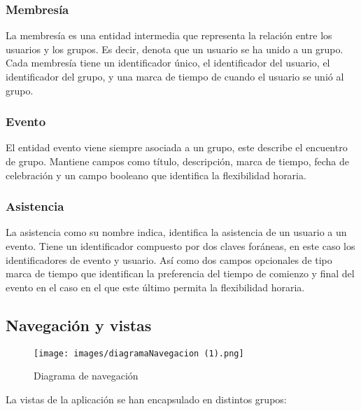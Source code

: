 \subsubsection{Membresía}
La membresía es una entidad intermedia que representa la relación entre los usuarios y los grupos. Es decir, denota que un usuario se ha unido a un grupo. Cada membresía tiene un identificador único, el identificador del usuario, el identificador del grupo, y una marca de tiempo de cuando el usuario se unió al grupo.

\subsubsection{Evento}
El entidad evento viene siempre asociada a un grupo, este describe el encuentro de grupo. Mantiene campos como título, descripción, marca de tiempo, fecha de celebración y un campo booleano que identifica la flexibilidad horaria.

\subsubsection{Asistencia}
La asistencia como su nombre indica, identifica la asistencia de un usuario a un evento. Tiene un identificador compuesto por dos claves foráneas, en este caso los identificadores de evento y usuario. Así como dos campos opcionales de tipo marca de tiempo que identifican la preferencia del tiempo de comienzo y final del evento en el caso en el que este último permita la flexibilidad horaria.

\begin{comment}
\subsection{Aspectos de Seguridad}
Es importante considerar aspectos de seguridad en el diseño de la aplicación. Por ejemplo, las contraseñas de los usuarios deben ser almacenadas de manera segura utilizando métodos de hash y sal. Además, debería haber autenticación y autorización adecuadas para asegurar que los usuarios solo puedan realizar acciones que les estén permitidas, como por ejemplo, un usuario solo puede eliminar un grupo si es el dueño de este.
\end{comment}

\subsection{Navegación y vistas}
\begin{figure}[H]
        \centering
        \texttt{[image: images/diagramaNavegacion (1).png]}
        \caption{Diagrama de navegación}
        \label{fig:diagramaER}
\end{figure}
La vistas de la aplicación se han encapsulado en distintos grupos:

